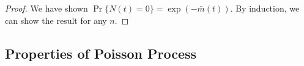 \documentclass[a4paper,10pt]{article}
\begin{document}
\begin{proof}
We have shown $\Pr\{N(t)=0\} = \exp(-\bar{m}(t))$. By induction, we can show the result for any $n$.
\end{proof}

\subsection{Properties of Poisson Process}
\end{document}
